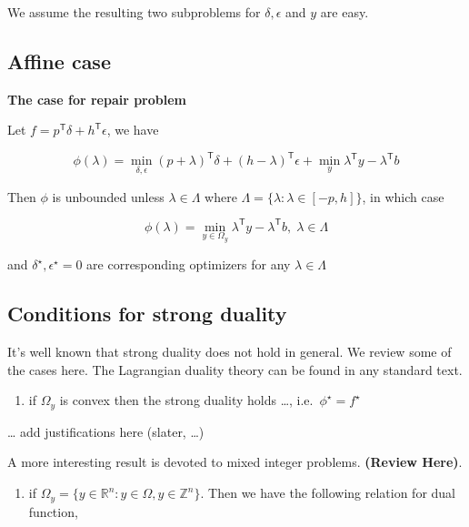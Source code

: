 \documentclass[
  a4paper,
,tablecaptionabove
]{scrartcl}
\numberwithin{equation}{section}
\providecommand{\tightlist}{%
  \setlength{\itemsep}{0pt}\setlength{\parskip}{0pt}}
\begin{document}
We assume the resulting two subproblems for \(\delta, \epsilon\) and
\(y\) are easy.

\hypertarget{sec:affine-case}{%
  \subsection{Affine case}\label{affine-case}}

\textbf{The case for repair problem}

Let \(f=p^\mathsf{T}\delta + h^\mathsf{T} \epsilon\), we have

\[\phi(\lambda) = \min_{\delta, \epsilon} (p+ \lambda)^\mathsf{T}\delta + (h - \lambda)^\mathsf{T} \epsilon+ \min_y \lambda^\mathsf{T} y - \lambda^\mathsf{T} b\]

Then \(\phi\) is unbounded unless \(\lambda \in \Lambda\) where
\(\Lambda = \{\lambda: \lambda \in [-p, h]\}\), in which case

\[\phi(\lambda) = \min_{y\in \Omega_y} \lambda^\mathsf{T} y - \lambda^\mathsf{T} b,\; \lambda\in \Lambda\]

and \(\delta^\star, \epsilon^\star = 0\) are corresponding optimizers
for any \(\lambda \in \Lambda\)

\hypertarget{sec:conditions-for-strong-duality}{%
  \subsection{Conditions for strong
    duality}\label{conditions-for-strong-duality}}

It's well known that strong duality does not hold in general. We review
some of the cases here. The Lagrangian duality theory can be found in
any standard text.

\begin{enumerate}
  \def\labelenumi{(\alph{enumi})}
  \tightlist
  \item
        if \(\Omega_y\) is convex then the strong duality holds \ldots,
        i.e.~\(\phi^\star = f^\star\)
\end{enumerate}

\ldots{} add justifications here (slater, \ldots)

A more interesting result is devoted to mixed integer problems.
\textbf{(Review Here)}.

\begin{enumerate}
  \def\labelenumi{(\alph{enumi})}
  \setcounter{enumi}{1}
  \tightlist
  \item
        if
        \(\Omega_y = \{y \in \mathbb R^n: y \in \Omega, y\in \mathbb Z^n\}\).
        Then we have the following relation for dual function,
\end{enumerate}
\end{document}
